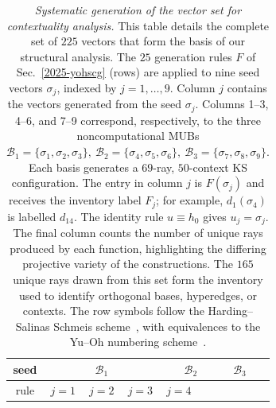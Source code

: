 \documentclass[%
  reprint,
  superscriptaddress,
  showkeys,
  amsmath,amssymb,
  aps,pra,
  longbibliography,
  floatfix,
  x11names
]{revtex4-2}
\begin{document}
\begin{table}[htbp]
\caption{\label{tab:vector_generation}
\textit{Systematic generation of the vector set for contextuality analysis.}
This table details the complete set of $225$ vectors that form the basis of our structural analysis.
The $25$ generation rules \(F\) of Sec.~\ref{2025-yohscg} (rows) are applied to nine seed vectors \(\sigma_j\), indexed by \(j=1,\ldots,9\). Column \(j\) contains the vectors generated from the seed \(\sigma_j\). Columns 1--3, 4--6, and 7--9 correspond, respectively, to the three noncomputational MUBs
\(
\mathcal B_1=\{\sigma_1,\sigma_2,\sigma_3\},\
\mathcal B_2=\{\sigma_4,\sigma_5,\sigma_6\},\
\mathcal B_3=\{\sigma_7,\sigma_8,\sigma_9\}.
\)
Each basis generates a $69$-ray, $50$-context KS configuration. The entry in column \(j\) is \(F(\sigma_j)\) and receives the inventory label \(F_j\); for example, \(d_1(\sigma_4)\) is labelled \(d_{14}\). The identity rule \(u\equiv h_0\) gives \(u_j=\sigma_j\).
The final column counts the number of unique rays produced by each function,
highlighting the differing projective variety of the constructions.
The $165$ unique rays drawn from this set form the inventory used to identify orthogonal bases, hyperedges, or contexts.
The row symbols follow the Harding--Salinas Schmeis scheme~\cite{harding2025remarksIJTP},
with equivalences to the Yu--Oh numbering scheme~\cite{Yu-2012}.
}
\begin{ruledtabular}
\begin{tabular}{ccccccccccc}
seed&
      \multicolumn{3}{c|}{$\mathcal{B}_1$}&
      \multicolumn{3}{c|}{$\mathcal{B}_2$}&
      \multicolumn{3}{c}{$\mathcal{B}_3$}\\
\hline
rule & 
$j=1$ &
$j=2$ &
$j=3$ &
$j=4$ &

\end{tabular}
\end{ruledtabular}
\end{table}
\end{document}
